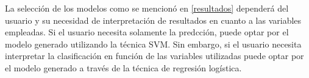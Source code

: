 La selección de los modelos como se mencionó en \ref{resultados}  dependerá del usuario y su necesidad de interpretación de resultados en cuanto a las variables empleadas. Si el usuario necesita solamente la predcción, puede optar por el modelo generado utilizando la técnica SVM. Sin embargo, si el usuario necesita interpretar la clasificación en función de las variables utilizadas puede optar por el modelo generado a través de la técnica de regresión logística.


